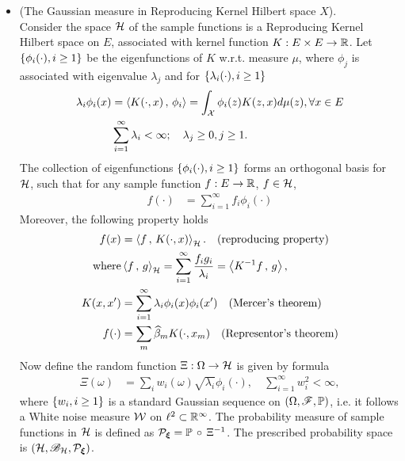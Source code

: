 \documentclass[11pt]{article}
\begin{document}
\begin{itemize}
\item  (The Gaussian measure in Reproducing Kernel Hilbert space $X$). \\
Consider the space ${\mathcal H}$ of the sample functions is a Reproducing Kernel Hilbert space on $E$, associated with kernel function $K: E\times E\rightarrow {\mathbb R}$. Let $\left\{\phi_{i}(\cdot), i\ge 1\right\}$ be the eigenfunctions of $K$ w.r.t. measure $\mu$, where $\phi_{j}$ is associated with eigenvalue $\lambda_{j}$ and for $\left\{\lambda_{i}(\cdot), i\ge 1\right\}$
\begin{align*}
\lambda_{i}\phi_{i}(x) &= \left\langle K(\cdot, x)\,,\, \phi_{i} \right\rangle= \int_{{\mathcal X}}\phi_{i}(z)K(z,x)d\mu(z), \forall x\in E\\
&\sum_{i=1}^{\infty}\lambda_{i} <\infty; \quad  \lambda_{j}\ge 0, j\ge 1.
\end{align*}
The collection of eigenfunctions  $\left\{\phi_{i}(\cdot), i\ge 1\right\}$ forms an orthogonal basis for ${\mathcal H}$, such that for any sample function $f: E \rightarrow {\mathbb R}$, $f\in {\mathcal H}$,
\begin{align*}
f(\cdot)&= \sum_{i=1}^{\infty}f_{i}\phi_{i}(\cdot)
\end{align*}
Moreover,  the following property holds
\begin{align*}
f(x)&= \left\langle f\,,\, K(\cdot, x) \right\rangle_{{\mathcal H}}. \quad (\text{reproducing property})\\
\text{where} & \left\langle f\,,\, g \right\rangle_{{\mathcal H}} = \sum_{i=1}^{\infty}\frac{f_{i}g_{i}}{\lambda_{i}} = \left\langle K^{-1}f\,,\, g \right\rangle, \\  
K(x,x') &= \sum_{i=1}^{\infty}\lambda_{i}\phi_{i}(x)\phi_{i}(x') \quad (\text{Mercer's theorem})\\
f(\cdot)&=\sum_{m}\widehat{\beta}_{m}K(\cdot, x_{m}) \quad (\text{Representor's theorem})
\end{align*} Now define the random function $\Xi: \Omega\rightarrow {\mathcal H}$ is given by formula
\begin{align}
\Xi(\omega) &=  \sum_{i}w_{i}(\omega)\sqrt{\lambda_{i}}\phi_{i}(\cdot), \quad \sum_{i=1}^{\infty}w_{i}^{2} <\infty,  
\end{align} where $\left\{w_{i}, i\ge 1\right\}$ is a standard Gaussian sequence on $(\Omega, {\mathscr F}, {\mathbb P})$, i.e. it follows a White noise measure ${\mathcal W}$ on $\ell^{2}\subset {\mathbb R}^{\infty}$. The probability measure of sample functions in ${\mathcal H}$ is defined as ${\mathcal P}_{\boldsymbol{\xi}}= {\mathbb P}\,\circ\, \Xi^{-1}$. The prescribed probability space is $({\mathcal H}, {\mathscr B}_{{\mathcal H}}, {\mathcal P}_{\boldsymbol{\xi}})$. 


\end{itemize}
\end{document}

